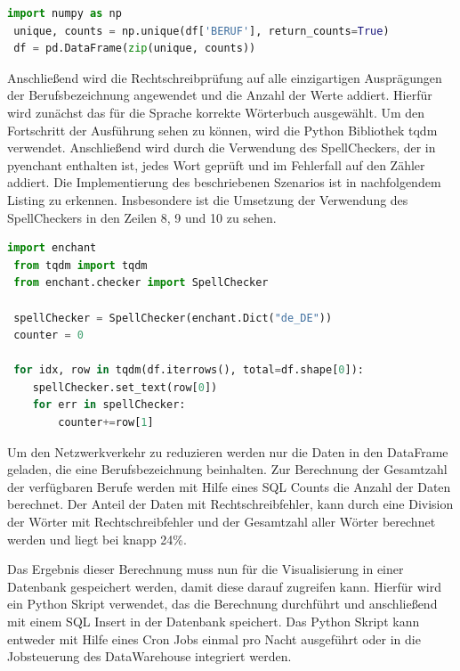 \begin{minipage}{\linewidth}
\begin{lstlisting}[language=Python,caption={Extraktion der eindeutigen Texte},captionpos=b]
 import numpy as np 
 unique, counts = np.unique(df['BERUF'], return_counts=True)
 df = pd.DataFrame(zip(unique, counts))
\end{lstlisting}
\end{minipage}


Anschließend wird die Rechtschreibprüfung auf alle einzigartigen Ausprägungen der Berufsbezeichnung angewendet und die Anzahl der Werte addiert. 
Hierfür wird zunächst das für die Sprache korrekte Wörterbuch ausgewählt. 
Um den Fortschritt der Ausführung sehen zu können, wird die Python Bibliothek tqdm %
verwendet. 
Anschließend wird durch die Verwendung des SpellCheckers, der in pyenchant enthalten ist, jedes Wort geprüft und im Fehlerfall auf den Zähler addiert.
Die Implementierung des beschriebenen Szenarios ist in nachfolgendem Listing zu erkennen. 
Insbesondere ist die Umsetzung der Verwendung des SpellCheckers in den Zeilen 8, 9 und 10 zu sehen. 

\begin{minipage}{\linewidth}
\begin{lstlisting}[language=Python,caption={Implementierung der Rechtschreibprüfung},captionpos=b]
 import enchant
 from tqdm import tqdm 
 from enchant.checker import SpellChecker
 
 spellChecker = SpellChecker(enchant.Dict("de_DE"))
 counter = 0
 
 for idx, row in tqdm(df.iterrows(), total=df.shape[0]):
    spellChecker.set_text(row[0])
    for err in spellChecker: 
        counter+=row[1]
\end{lstlisting}
\end{minipage}

Um den Netzwerkverkehr zu reduzieren werden nur die Daten in den DataFrame geladen, die eine Berufsbezeichnung beinhalten. 
Zur Berechnung der Gesamtzahl der verfügbaren Berufe werden mit Hilfe eines SQL Counts die Anzahl der Daten berechnet.
Der Anteil der Daten mit Rechtschreibfehler, kann durch eine Division der Wörter mit Rechtschreibfehler und der Gesamtzahl aller Wörter berechnet werden und liegt bei knapp 24\%. 


Das Ergebnis dieser Berechnung muss nun für die Visualisierung in einer Datenbank gespeichert werden, damit diese darauf zugreifen kann. 
Hierfür wird ein Python Skript verwendet, das die Berechnung durchführt und anschließend mit einem SQL Insert in der Datenbank speichert. 
Das Python Skript kann entweder mit Hilfe eines Cron Jobs einmal pro Nacht ausgeführt oder in die Jobsteuerung des DataWarehouse integriert werden.


